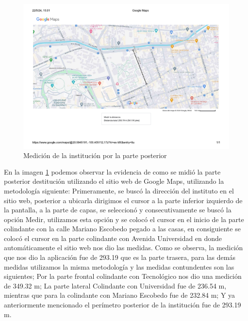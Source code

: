     \begin{figure}[H] 
        \centering
        \includegraphics[trim = {12mm 20mm 10mm 14mm},clip,scale=0.45]{22/Img/evidenciaDeMedicionEnMaps.pdf}
        \caption{Medición de la institución por la parte posterior}
        \label{fig:medicionMaps}
    \end{figure}
    
    En la imagen \ref{fig:medicionMaps} podemos observar la evidencia de como se midió la parte posterior destitución utilizando el sitio web de Google Maps, utilizando la metodología siguiente: Primeramente, se buscó la dirección del instituto en el sitio web, posterior a ubicarla dirigimos el cursor a la parte inferior izquierdo de la pantalla, a la parte de capas, se seleccionó y consecutivamente se buscó la opción Medir, utilizamos esta opción y se colocó el cursor en el inicio de la parte  colindante con la calle Mariano Escobedo pegado a las casas, en consiguiente se colocó el cursor en la parte colindante con Avenida Universidad en donde automáticamente el sitio web nos dio las medidas. Como se observa, la medición que nos dio la aplicación fue de 293.19 que es la parte trasera, para las demás medidas utilizamos la misma metodología y las medidas contundentes son las siguientes; Por la parte frontal colindante con Tecnológico nos dio una medición de 349.32 m; La parte lateral Colindante con Universidad fue de 236.54 m, mientras que para la colindante con Mariano Escobedo fue de 232.84 m; Y ya anteriormente mencionado el perímetro posterior de la institución fue de 293.19 m.
    
